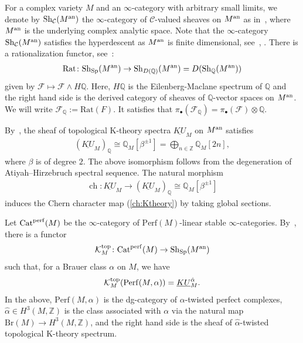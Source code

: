 \documentclass [11pt,oneside,a4paper,mathscr]{amsart}
\theoremstyle{definition}
\newcommand{\ch}{\operatorname{ch}}
\begin{document}
For a complex variety $M$ and an $\infty$-category with arbitrary 
small limits, we denote by 
$\mathrm{Sh}_{\mathcal{C}}(M^{\rm{an}})$ the $\infty$-category of
$\mathcal{C}$-valued sheaves on $M^{\rm{an}}$
as in~\cite[Section~1.3.1]{LSAG}, 
where $M^{\rm{an}}$ is the underlying complex analytic 
space. Note that the $\infty$-category $\mathrm{Sh}_{\mathcal{C}}(M^{\rm{an}})$ satisfies the hyperdescent as 
$M^{\rm{an}}$ is finite dimensional, see~\cite[Cor.~7.2.1.12]{Ltopos}, \cite[Prop.~A.20]{GS}.
There is a rationalization functor, see~\cite[Definition~2.6]{GS}:
\begin{align*}
	\mathrm{Rat} \colon \mathrm{Sh}_{\mathrm{Sp}}(M^{\rm{an}}) \to 
	\mathrm{Sh}_{D(\mathbb{Q})}(M^{\rm{an}})=D(\mathrm{Sh}_{\mathbb{Q}}(M^{\rm{an}}))
\end{align*}
given by $\mathcal{F} \mapsto \mathcal{F} \wedge H\mathbb{Q}$. 
Here, $H\mathbb{Q}$ is the Eilenberg-Maclane spectrum
of $\mathbb{Q}$ and 
the right hand side is the derived category of sheaves of $\mathbb{Q}$-vector 
spaces on $M^{\rm{an}}$.
We will write $\mathcal{F}_{\mathbb{Q}} :=\mathrm{Rat}(F)$. 
It satisfies that 
$\pi_{\bullet}(\mathcal{F}_{\mathbb{Q}})=\pi_{\bullet}(\mathcal{F})\otimes \mathbb{Q}$. 

By~\cite[Lemma~2.7]{GS}, 
the sheaf of topological K-theory spectra $\underline{KU}_M$ on $M^{\rm{an}}$ satisfies
\begin{align}\label{isom:KU}
	(\underline{KU}_{M})_{\mathbb{Q}} \cong \mathbb{Q}_M[\beta^{\pm 1}]
	=\bigoplus_{n\in \mathbb{Z}} \mathbb{Q}_M[2n],
\end{align}
where $\beta$ is of degree $2$. 
The above isomorphism follows from the degeneration of 
Atiyah--Hirzebruch spectral sequence. 
The natural morphism 
\begin{align*}
    \ch \colon \underline{KU}_M \to (\underline{KU}_M)_{\mathbb{Q}} \cong \mathbb{Q}_M[\beta^{\pm 1}]
\end{align*}
induces the Chern character map (\ref{ch:Ktheory}) by taking global sections. 

Let 
$\mathrm{Cat}^{\rm{perf}}(M)$ be
the $\infty$-category of $\mathrm{Perf}(M)$-linear stable 
$\infty$-categories. 
By~\cite{Moulinos}, there is a functor 
\begin{align}\label{def:reltopK:dg}
	\mathcal{K}_{M}^{\rm{top}} \colon 
	\mathrm{Cat}^{\rm{perf}}(M) \to \mathrm{Sh}_{\mathrm{Sp}}(M^{\rm{an}})  
\end{align}
such that, for a Brauer class $\alpha$ on $M$, 
we have 
\begin{align}\label{isom:ktopalpha}
	\mathcal{K}_M^{\rm{top}}(\mathrm{Perf}(M, \alpha))=\underline{KU}^{\hat{\alpha}}_M. 
\end{align}
In the above, 
$\mathrm{Perf}(M, \alpha)$ is the dg-category of $\alpha$-twisted 
perfect complexes, 
$\hat{\alpha} \in H^3(M, \mathbb{Z})$ is the class associated with $\alpha$
via the natural map $\mathrm{Br}(M) \to H^3(M, \mathbb{Z})$, 
and the right hand side is the sheaf of $\hat{\alpha}$-twisted topological K-theory spectrum.
\end{document}
